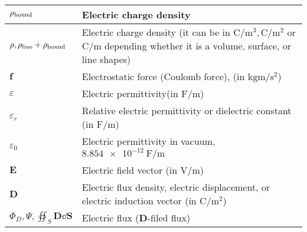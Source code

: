 \documentclass{article}
\begin{document}
\begin{xltabular}{\textwidth}{XX}
	\(\rho_{\textnormal{bound}}\)                                & Electric charge density                                                                                                                                                                  \\ \hline
	\(\rho, \rho_{\textnormal{free}}+\rho_{\textnormal{bound}}\) & Electric charge density (it can be in \(\si{\coulomb\per\meter^3}, \si{\coulomb\per\meter^2}\) or \(\si{\coulomb\per\meter}\) depending whether it is a volume, surface, or line shapes) \\ \hline
	\(\mathbf{f}\)                                               & Electrostatic force (Coulomb force), (in \(\si{\kilo\gram\meter\per\second\squared}\))                                                                                                   \\ \hline
	\(\varepsilon\)                                              & Electric permittivity(in \(\si{\farad\per\meter}\)) \cite{ramoFieldsWavesCommunication1994}                                                                                              \\ \hline
	\(\varepsilon_r\)                                            & Relative electric permittivity or dielectric constant (in \(\si{\farad\per\meter}\)) \cite{ramoFieldsWavesCommunication1994}                                                             \\ \hline
	\(\varepsilon_0\)                                            & Electric permittivity in vacuum, \(\SI{8.854e-12}{\farad\per\meter}\) \cite{ramoFieldsWavesCommunication1994}                                                                            \\ \hline
	\(\mathbf{E}\)                                               & Electric field vector (in \(\si{\volt\per\meter}\))                                                                                                                                      \\ \hline
	\(\mathbf{D}\)                                               & Electric flux density, electric displacement, or electric induction vector (in \(\si{\coulomb\per\meter\squared}\))                                                                      \\ \hline
	\(\Phi_D, \varPsi, \oiint_S \mathbf{D} \dd{\mathbf{S}}\)     & Electric flux (\(\mathbf{D}\)-filed flux) \cite{wiki:D-field-flux}                                                                                                                       \\ \hline

\end{xltabular}
\end{document}
